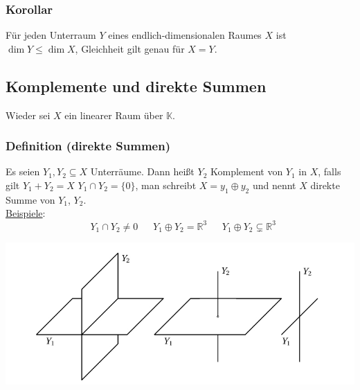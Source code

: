 \subsubsection{Korollar}
Für jeden Unterraum $Y$ eines endlich-dimensionalen Raumes $X$ ist $\dim Y\leq\dim X$, Gleichheit gilt genau für $X=Y$.
\subsection{Komplemente und direkte Summen}
Wieder sei $X$ ein linearer Raum über $\mathbb{K}$.
\subsubsection{Definition (direkte Summen)}
Es seien $Y_1,Y_2\subseteq X$ Unterräume. Dann heißt $Y_2$ Komplement von $Y_1$ in $X$, falls gilt $Y_1+Y_2=X$ $Y_1\cap Y_2=\{0\}$, man schreibt $X=y_1\oplus y_2$ und nennt $X$ direkte Summe von $Y_1$, $Y_2$.\\
\underline{Beispiele}:\\
\[\ \ \ Y_1\cap Y_2 \neq 0 \ \ \ \ \ \ \ Y_1\oplus Y_2=\mathbb{R}^3\ \ \ \ \ \ \ Y_1\oplus Y_2\subsetneq \mathbb{R}^3\]
\begin{center}
\includegraphics[scale=0.4]{2-5-1.jpg}
\end{center}

